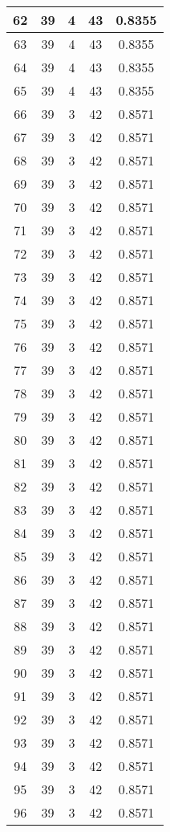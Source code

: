 \documentclass[letterpaper, 12pt]{article}
\begin{document}
\begin{longtable}{|c|c|c|c|c|}
\hline
62 & 39 & 4 & 43 & 0.8355 \\
\hline
63 & 39 & 4 & 43 & 0.8355 \\
\hline
64 & 39 & 4 & 43 & 0.8355 \\
\hline
65 & 39 & 4 & 43 & 0.8355 \\
\hline
66 & 39 & 3 & 42 & 0.8571 \\
\hline
67 & 39 & 3 & 42 & 0.8571 \\
\hline
68 & 39 & 3 & 42 & 0.8571 \\
\hline
69 & 39 & 3 & 42 & 0.8571 \\
\hline
70 & 39 & 3 & 42 & 0.8571 \\
\hline
71 & 39 & 3 & 42 & 0.8571 \\
\hline
72 & 39 & 3 & 42 & 0.8571 \\
\hline
73 & 39 & 3 & 42 & 0.8571 \\
\hline
74 & 39 & 3 & 42 & 0.8571 \\
\hline
75 & 39 & 3 & 42 & 0.8571 \\
\hline
76 & 39 & 3 & 42 & 0.8571 \\
\hline
77 & 39 & 3 & 42 & 0.8571 \\
\hline
78 & 39 & 3 & 42 & 0.8571 \\
\hline
79 & 39 & 3 & 42 & 0.8571 \\
\hline
80 & 39 & 3 & 42 & 0.8571 \\
\hline
81 & 39 & 3 & 42 & 0.8571 \\
\hline
82 & 39 & 3 & 42 & 0.8571 \\
\hline
83 & 39 & 3 & 42 & 0.8571 \\
\hline
84 & 39 & 3 & 42 & 0.8571 \\
\hline
85 & 39 & 3 & 42 & 0.8571 \\
\hline
86 & 39 & 3 & 42 & 0.8571 \\
\hline
87 & 39 & 3 & 42 & 0.8571 \\
\hline
88 & 39 & 3 & 42 & 0.8571 \\
\hline
89 & 39 & 3 & 42 & 0.8571 \\
\hline
90 & 39 & 3 & 42 & 0.8571 \\
\hline
91 & 39 & 3 & 42 & 0.8571 \\
\hline
92 & 39 & 3 & 42 & 0.8571 \\
\hline
93 & 39 & 3 & 42 & 0.8571 \\
\hline
94 & 39 & 3 & 42 & 0.8571 \\
\hline
95 & 39 & 3 & 42 & 0.8571 \\
\hline
96 & 39 & 3 & 42 & 0.8571 \\

\end{longtable}
\end{document}
